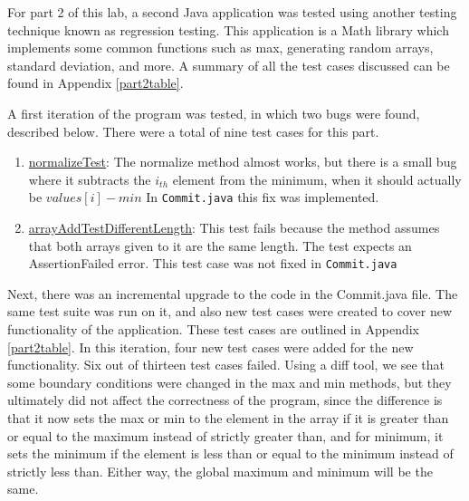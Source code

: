 For part 2 of this lab, a second Java application was tested using another
testing technique known as regression testing. This application is a Math
library which implements some common functions such as max, generating random
arrays, standard deviation, and more. A summary of all the test cases discussed
can be found in Appendix \ref{part2table}.

A first iteration of the program was tested, in which two bugs were found,
described below. There were a total of nine test cases for this part.

\begin{enumerate}
  \item \underline{normalizeTest}:
          The normalize method almost works, but there is a small bug where it
          subtracts the $i_{th}$ element from the minimum, when it should
          actually be $values[i] - min$
          In \texttt{Commit.java} this fix was implemented.
  \item \underline{arrayAddTestDifferentLength}:
          This test fails because the method assumes that both arrays given to
          it are the same length. The test expects an AssertionFailed error.
          This test case was not fixed in \texttt{Commit.java}
\end{enumerate}

Next, there was an incremental upgrade to the code in the Commit.java file.  The
same test suite was run on it, and also new test cases were created to cover new
functionality of the application. These test cases are outlined in Appendix
\ref{part2table}. In this iteration, four new test cases were added for the new
functionality. Six out of thirteen test cases failed.  Using a diff tool, we see
that some boundary conditions were changed in the max and min methods, but they
ultimately did not affect the correctness of the program, since the difference
is that it now sets the max or min to the element in the array if it is greater
than or equal to the maximum instead of strictly greater than, and for minimum,
it sets the minimum if the element is less than or equal to the minimum instead
of strictly less than. Either way, the global maximum and minimum will be the
same. 

